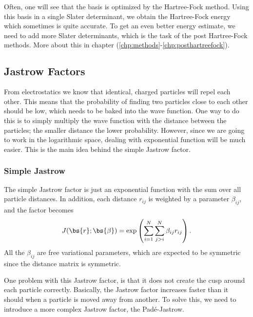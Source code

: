 Often, one will see that the basis is optimized by the Hartree-Fock method. Using this basis in a single Slater determinant, we obtain the Hartree-Fock energy which sometimes is quite accurate. To get an even better energy estimate, we need to add more Slater determinants, which is the task of the post Hartree-Fock methods. More about this in chapter (\ref{chp:methods}-\ref{chp:posthartreefock}).

\subsection{Jastrow Factors} \label{subsubsec:jastrow}
From electrostatics we know that identical, charged particles will repel each other. This means that the probability of finding two particles close to each other should be low, which needs to be baked into the wave function. One way to do this is to simply multiply the wave function with the distance between the particles; the smaller distance the lower probability. However, since we are going to work in the logarithmic space, dealing with exponential function will be much easier. This is the main idea behind the simple Jastrow factor.

\subsubsection{Simple Jastrow}
The simple Jastrow factor is just an exponential function with the sum over all particle distances. In addition, each distance $r_{ij}$ is weighted by a parameter $\beta_{ij}$, and the factor becomes
\begin{equation}
J(\bs{r}; \bs{\beta}) = \exp\left(\sum_{i=1}^N\sum_{j>i}^N{\beta_{ij}r_{ij}}\right).
\label{eq:SimpleJastrow}
\end{equation}
All the $\beta_{ij}$ are free variational parameters, which are expected to be symmetric since the distance matrix is symmetric.

One problem with this Jastrow factor, is that it does not create the cusp around each particle correctly. Basically, the Jastrow factor increases faster than it should when a particle is moved away from another. To solve this, we need to introduce a more complex Jastrow factor, the Padé-Jastrow.

